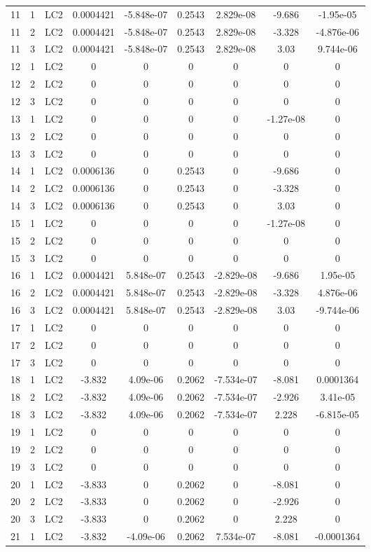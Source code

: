 \documentclass{article}%
\begin{document}
\begin{longtable}{| c c c | c c c c c c |}
11&1&LC2&0.0004421&{-}5.848e{-}07&0.2543&2.829e{-}08&{-}9.686&{-}1.95e{-}05\\%
11&2&LC2&0.0004421&{-}5.848e{-}07&0.2543&2.829e{-}08&{-}3.328&{-}4.876e{-}06\\%
11&3&LC2&0.0004421&{-}5.848e{-}07&0.2543&2.829e{-}08&3.03&9.744e{-}06\\%
12&1&LC2&0&0&0&0&0&0\\%
12&2&LC2&0&0&0&0&0&0\\%
12&3&LC2&0&0&0&0&0&0\\%
13&1&LC2&0&0&0&0&{-}1.27e{-}08&0\\%
13&2&LC2&0&0&0&0&0&0\\%
13&3&LC2&0&0&0&0&0&0\\%
14&1&LC2&0.0006136&0&0.2543&0&{-}9.686&0\\%
14&2&LC2&0.0006136&0&0.2543&0&{-}3.328&0\\%
14&3&LC2&0.0006136&0&0.2543&0&3.03&0\\%
15&1&LC2&0&0&0&0&{-}1.27e{-}08&0\\%
15&2&LC2&0&0&0&0&0&0\\%
15&3&LC2&0&0&0&0&0&0\\%
16&1&LC2&0.0004421&5.848e{-}07&0.2543&{-}2.829e{-}08&{-}9.686&1.95e{-}05\\%
16&2&LC2&0.0004421&5.848e{-}07&0.2543&{-}2.829e{-}08&{-}3.328&4.876e{-}06\\%
16&3&LC2&0.0004421&5.848e{-}07&0.2543&{-}2.829e{-}08&3.03&{-}9.744e{-}06\\%
17&1&LC2&0&0&0&0&0&0\\%
17&2&LC2&0&0&0&0&0&0\\%
17&3&LC2&0&0&0&0&0&0\\%
18&1&LC2&{-}3.832&4.09e{-}06&0.2062&{-}7.534e{-}07&{-}8.081&0.0001364\\%
18&2&LC2&{-}3.832&4.09e{-}06&0.2062&{-}7.534e{-}07&{-}2.926&3.41e{-}05\\%
18&3&LC2&{-}3.832&4.09e{-}06&0.2062&{-}7.534e{-}07&2.228&{-}6.815e{-}05\\%
19&1&LC2&0&0&0&0&0&0\\%
19&2&LC2&0&0&0&0&0&0\\%
19&3&LC2&0&0&0&0&0&0\\%
20&1&LC2&{-}3.833&0&0.2062&0&{-}8.081&0\\%
20&2&LC2&{-}3.833&0&0.2062&0&{-}2.926&0\\%
20&3&LC2&{-}3.833&0&0.2062&0&2.228&0\\%
21&1&LC2&{-}3.832&{-}4.09e{-}06&0.2062&7.534e{-}07&{-}8.081&{-}0.0001364\\%

\end{longtable}
\end{document}
